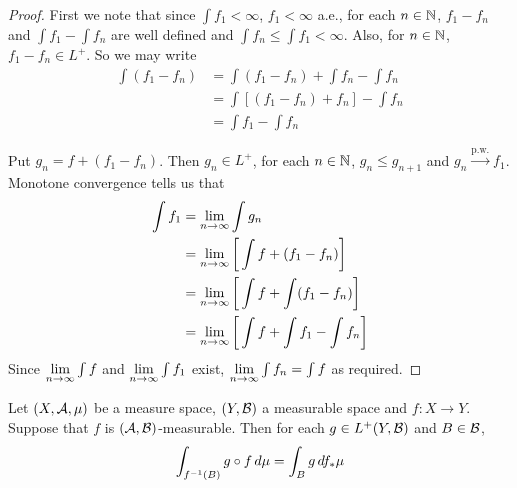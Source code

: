 \documentclass{book}
\begin{document}
	\begin{proof}
		First we note that since $\int f_1 < \infty$, $f_1 < \infty$ a.e., for each $n \in \mathbb{N}$, $f_1 - f_n$ and $\int f_1 - \int f_n$ are well defined and $\int f_n \leq \int f_1 < \infty$. Also, for $n \in \mathbb{N}$, $f_1 -f_n \in L^+$. So we may write 
		\begin{align*}
			\int (f_1 - f_n) 
			&= \int (f_1 - f_n)  + \int f_n - \int f_n\\
			&= \int [(f_1 - f_n) + f_n] - \int f_n\\
			&= \int f_1 - \int f_n
		\end{align*}
		
		Put $g_n = f + (f_1 - f_n)$. Then $g_n \in L^+$, for each $n \in \mathbb{N}$, $g_n \leq g_{n+1}$ and $g_n \xrightarrow{\text{p.w.}} f_1$. Monotone convergence tells us that 
		\begin{align*}
			\int f_1 
			&= \lim \limits_{n \rightarrow \infty} \int g_n\\
			&= \lim \limits_{n \rightarrow \infty} \bigg[\int f + (f_1-f_n)\bigg]\\
			&= \lim \limits_{n \rightarrow \infty} \bigg[ \int f + \int (f_1-f_n)\bigg] \\
			&= \lim \limits_{n \rightarrow \infty} \bigg[ \int f + \int f_1- \int f_n\bigg] 
		\end{align*}
		Since $\lim \limits_{n \rightarrow \infty} \int f$ and $\lim \limits_{n \rightarrow \infty} \int f_1$ exist, $\lim \limits_{n \rightarrow \infty} \int f_n = \int f$ as required.  
	\end{proof}


	\begin{ex} 
		Let $(X, \mathcal{A}, \mu)$ be a measure space, $(Y, \mathcal{B})$ a measurable space and $f: X \rightarrow Y$. Suppose that $f$ is $(\mathcal{A}, \mathcal{B})$-measurable. Then for each $g \in L^+(Y, \mathcal{B})$ and $B \in \mathcal{B}$, $$\int_{f^{-1}(B)} g \circ f \, d \mu = \int_B g \, d f_*\mu$$
	\end{ex}
\end{document}
